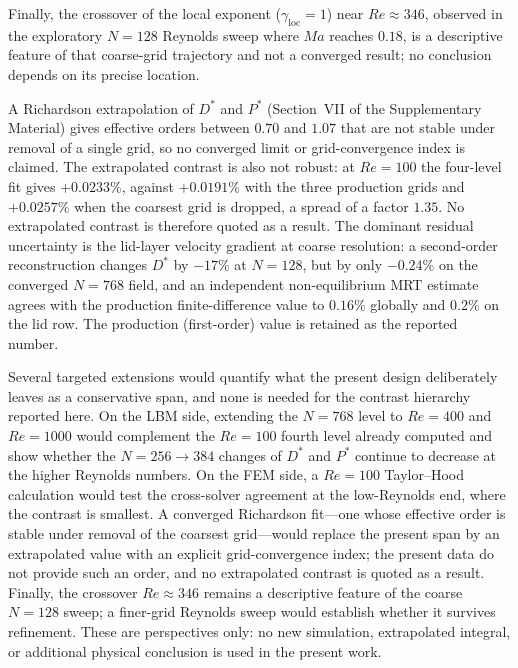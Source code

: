 Finally, the crossover of the local exponent ($\gamma_{\mathrm{loc}}=1$) near $Re\approx346$, observed in the exploratory $N=128$ Reynolds sweep where $Ma$ reaches $0.18$, is a descriptive feature of that coarse-grid trajectory and not a converged result; no conclusion depends on its precise location.

A Richardson extrapolation of $D^*$ and $P^*$ (Section~VII of the Supplementary Material) gives effective orders between $0.70$ and $1.07$ that are not stable under removal of a single grid, so no converged limit or grid-convergence index is claimed. The extrapolated contrast is also not robust: at $Re=100$ the four-level fit gives $+0.0233\%$, against $+0.0191\%$ with the three production grids and $+0.0257\%$ when the coarsest grid is dropped, a spread of a factor $1.35$. No extrapolated contrast is therefore quoted as a result. The dominant residual uncertainty is the lid-layer velocity gradient at coarse resolution: a second-order reconstruction changes $D^*$ by $-17\%$ at $N=128$, but by only $-0.24\%$ on the converged $N=768$ field, and an independent non-equilibrium MRT estimate agrees with the production finite-difference value to $0.16\%$ globally and $0.2\%$ on the lid row. The production (first-order) value is retained as the reported number.

Several targeted extensions would quantify what the present design deliberately leaves as a conservative span, and none is needed for the contrast hierarchy reported here. On the LBM side, extending the $N=768$ level to $Re=400$ and $Re=1000$ would complement the $Re=100$ fourth level already computed and show whether the $N=256\to384$ changes of $D^*$ and $P^*$ continue to decrease at the higher Reynolds numbers. On the FEM side, a $Re=100$ Taylor--Hood calculation would test the cross-solver agreement at the low-Reynolds end, where the contrast is smallest. A converged Richardson fit---one whose effective order is stable under removal of the coarsest grid---would replace the present span by an extrapolated value with an explicit grid-convergence index; the present data do not provide such an order, and no extrapolated contrast is quoted as a result. Finally, the crossover $Re\approx346$ remains a descriptive feature of the coarse $N=128$ sweep; a finer-grid Reynolds sweep would establish whether it survives refinement. These are perspectives only: no new simulation, extrapolated integral, or additional physical conclusion is used in the present work.
